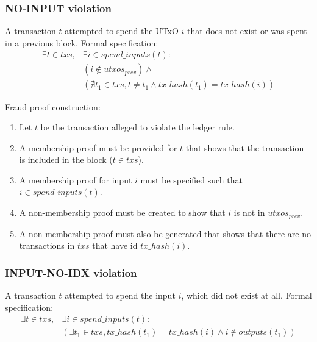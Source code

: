 \documentclass[../midgard.tex]{subfiles}
\begin{document}
\subsubsection{NO-INPUT violation}
\label{violation:NO-INPUT}
A transaction $t$ attempted to spend the UTxO $i$ that does not exist or was spent in a previous block.
Formal specification:
\begin{equation*}
\begin{split}
    \exists t \in txs, &\exists i \in spend\_inputs(t): \\
    &( i \notin utxos_{prev} ) \land  \\
    &( \nexists t_1 \in txs, t \neq t_1 \land tx\_hash(t_1) = tx\_hash(i) )
\end{split}
\end{equation*}

Fraud proof construction:
\begin{enumerate}
  \item Let $t$ be the transaction alleged to violate the ledger rule. 
  \item A membership proof must be provided for $t$ that shows that the transaction is included in the block ($t \in txs$).
  \item A membership proof for input $i$ must be specified such that $i \in spend\_inputs(t)$.
  \item A non-membership proof must be created to show that $i$ is not in $utxos_{prev}$.
  \item A non-membership proof must also be generated that shows that there are no transactions in $txs$ that have id $tx\_hash(i)$.
\end{enumerate}

\subsubsection{INPUT-NO-IDX violation}
\label{violation:INPUT-NO-IDX}
A transaction $t$ attempted to spend the input $i$, which did not exist at all.
Formal specification:
\begin{equation*}
\begin{split}
    \exists t \in txs, &\exists i \in spend\_inputs(t): \\
    &( \exists t_1 \in txs, tx\_hash(t_1) = tx\_hash(i) \land i \notin outputs(t_1) )
\end{split}
\end{equation*}
\end{document}
